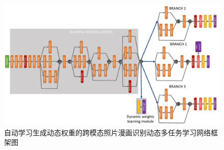 \documentclass[12pt]{article}
\begin{document}
\begin{sloppypar}
\begin{figure}[H]
	\centering
	\includegraphics[width=\textwidth]{sections/figs/cnn.png}
	\caption{\label{fig2.11} \xiaowuhao \hei 自动学习生成动态权重的跨模态照片漫画识别动态多任务学习网络框架图}
\end{figure}
\begin{multicols*}{2}
~\\~\\~\\~\\~\\~\\~\\~\\


    
   \vspace{0.5cm}
   	\nocite{*}
\end{multicols*}
 
\end{sloppypar}
\end{document}

